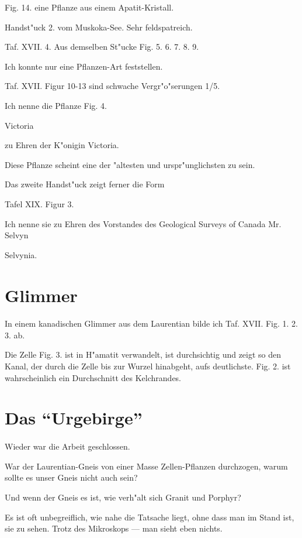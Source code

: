 \documentclass[a4paper, 11pt, oneside, german]{article}
\begin{document}
Fig. 14. eine Pflanze aus einem Apatit-Kristall.

Handst"uck 2. vom Muskoka-See. Sehr feldspatreich.

Taf. XVII. 4. Aus demselben St"ucke Fig. 5. 6. 7. 8. 9.

Ich konnte nur eine Pflanzen-Art feststellen.

Taf. XVII. Figur 10-13 sind schwache Vergr"o"serungen 1/5.

Ich nenne die Pflanze Fig. 4.

Victoria

zu Ehren der K"onigin Victoria.

Diese Pflanze scheint eine der "altesten und urspr"unglichsten zu sein.

Das zweite Handst"uck zeigt ferner die Form

Tafel XIX. Figur 3.

Ich nenne sie zu Ehren des Vorstandes des Geological Surveys of Canada Mr. Selvyn

Selvynia.
\clearpage
\section{Glimmer}
\paragraph{}
In einem kanadischen Glimmer aus dem Laurentian bilde ich Taf. XVII. Fig. 1. 2. 3. ab.

Die Zelle Fig. 3. ist in H"amatit verwandelt, ist durchsichtig und zeigt so den Kanal, der durch die Zelle bis zur Wurzel hinabgeht, aufs deutlichste. Fig. 2. ist wahrscheinlich ein Durchschnitt des Kelchrandes.
\clearpage
\section{Das "`Urgebirge"'}
\paragraph{}
Wieder war die Arbeit geschlossen.

War der Laurentian-Gneis von einer Masse Zellen-Pflanzen durchzogen, warum sollte es unser Gneis nicht auch sein?

Und wenn der Gneis es ist, wie verh"alt sich Granit und Porphyr?

Es ist oft unbegreiflich, wie nahe die Tatsache liegt, ohne dass man im Stand ist, sie zu sehen. Trotz des Mikroskops --- man sieht eben nichts.
\end{document}
